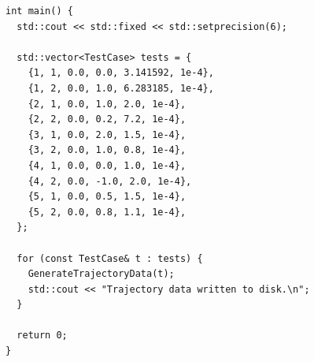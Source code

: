 \begin{lstlisting}[caption=Файл \texttt{main.cpp}]
int main() {
  std::cout << std::fixed << std::setprecision(6);

  std::vector<TestCase> tests = {
    {1, 1, 0.0, 0.0, 3.141592, 1e-4}, 
    {1, 2, 0.0, 1.0, 6.283185, 1e-4}, 
    {2, 1, 0.0, 1.0, 2.0, 1e-4}, 
    {2, 2, 0.0, 0.2, 7.2, 1e-4}, 
    {3, 1, 0.0, 2.0, 1.5, 1e-4}, 
    {3, 2, 0.0, 1.0, 0.8, 1e-4}, 
    {4, 1, 0.0, 0.0, 1.0, 1e-4}, 
    {4, 2, 0.0, -1.0, 2.0, 1e-4}, 
    {5, 1, 0.0, 0.5, 1.5, 1e-4}, 
    {5, 2, 0.0, 0.8, 1.1, 1e-4},
  };

  for (const TestCase& t : tests) {
    GenerateTrajectoryData(t);
    std::cout << "Trajectory data written to disk.\n";
  }

  return 0;
}
\end{lstlisting}